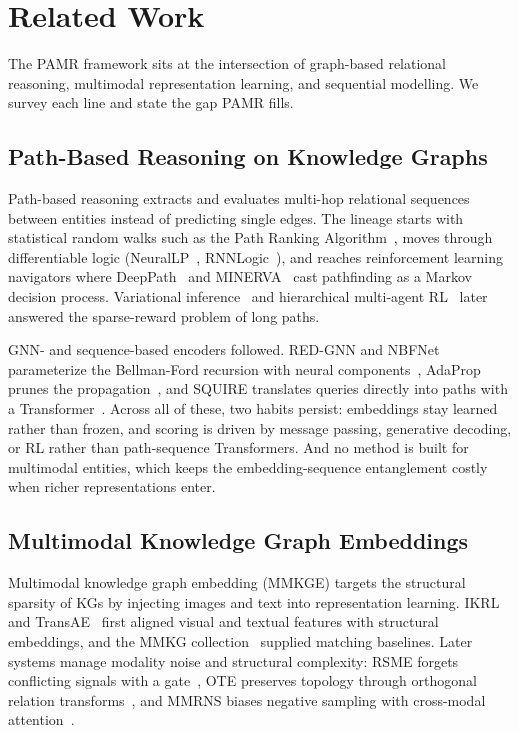 \documentclass[runningheads]{llncs}
\begin{document}
\section{Related Work}
\label{sec:related-work}

The PAMR framework sits at the intersection of graph-based relational reasoning, multimodal representation learning, and sequential modelling. We survey each line and state the gap PAMR fills.

\subsection{Path-Based Reasoning on Knowledge Graphs}
\label{sec:rw-path-reasoning}

Path-based reasoning extracts and evaluates multi-hop relational sequences between entities instead of predicting single edges. The lineage starts with statistical random walks such as the Path Ranking Algorithm~\cite{lao2011random}, moves through differentiable logic (NeuralLP~\cite{yang2017differentiable}, RNNLogic~\cite{qu2021rnnlogic}), and reaches reinforcement learning navigators where DeepPath~\cite{xiong2017deeppath} and MINERVA~\cite{das2018go} cast pathfinding as a Markov decision process. Variational inference~\cite{chen2018variational} and hierarchical multi-agent RL~\cite{zhang2022learning} later answered the sparse-reward problem of long paths.

GNN- and sequence-based encoders followed. RED-GNN and NBFNet parameterize the Bellman-Ford recursion with neural components~\cite{zhang2022knowledge,zhu2021neural}, AdaProp prunes the propagation~\cite{zhang2023adaprop}, and SQUIRE translates queries directly into paths with a Transformer~\cite{bai2022squire}. Across all of these, two habits persist: embeddings stay learned rather than frozen, and scoring is driven by message passing, generative decoding, or RL rather than path-sequence Transformers. And no method is built for multimodal entities, which keeps the embedding-sequence entanglement costly when richer representations enter.

\subsection{Multimodal Knowledge Graph Embeddings}
\label{sec:rw-mmkge}

Multimodal knowledge graph embedding (MMKGE) targets the structural sparsity of KGs by injecting images and text into representation learning. IKRL~\cite{xie2017image} and TransAE~\cite{wang2019transae} first aligned visual and textual features with structural embeddings, and the MMKG collection~\cite{liu2019mmkg} supplied matching baselines. Later systems manage modality noise and structural complexity: RSME forgets conflicting signals with a gate~\cite{wang2021rsme}, OTE preserves topology through orthogonal relation transforms~\cite{tang2020orthogonal}, and MMRNS biases negative sampling with cross-modal attention~\cite{xu2022multimodal}.
\end{document}
